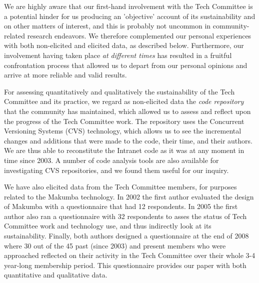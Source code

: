 \documentclass{acm_proc_article-sp}
\begin{document}
We are highly aware that our first-hand involvement with the Tech Committee is a potential hinder for us producing an 'objective' account of its sustainability and on other matters of interest, and this is probably not uncommon in community-related research endeavors. We therefore complemented our personal experiences with both non-elicited and elicited data, as described below. Furthermore, our involvement having taken place {\it at different times} has resulted in a fruitful confrontation process that allowed us to depart from our personal opinions and arrive at more reliable and valid results.

For assessing quantitatively and qualitatively the sustainability of the Tech Committee and its practice, we regard as non-elicited data the {\it code repository} that the community has maintained, which allowed us to assess and reflect upon the progress of the Tech Committee work. The repository uses the Concurrent Versioning Systems (CVS) technology, which allows us to see the incremental changes and additions that were made to the code, their time, and their authors. We are thus able to reconstitute the Intranet code as it was at any moment in time since 2003. A number of code analysis tools are also available for investigating CVS repositories, and we found them useful for our inquiry.

We have also elicited data from the Tech Committee members, for purposes related to the Makumba technology. In 2002 the first author evaluated the design of Makumba with a questionnaire that had 12 respondents. In 2005 the first author also ran a questionnaire with 32 respondents to asses the status of Tech Committee work and technology use, and thus indirectly look at its sustainability. Finally, both authors designed a questionnaire at the end of 2008 where 30 out of the 45 past (since 2003) and present members who were approached reflected on their activity in the Tech Committee over their whole 3-4 year-long membership period. This questionnaire provides our paper with both quantitative and qualitative data. 
\end{document}

